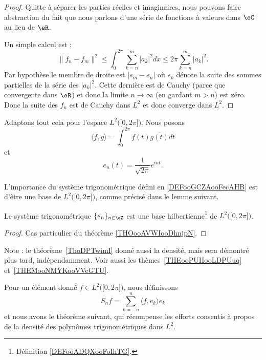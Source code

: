 \begin{proof}
    Quitte à séparer les parties réelles et imaginaires, nous pouvons faire abstraction du fait que nous parlons d'une série de fonctions à valeurs dans \( \eC\) au lieu de \( \eR\).

    Un simple calcul est :
    \begin{equation}    \label{EqHVdJxZT}
        \| f_n-f_m \|^2\leq\int_0^{2\pi}\sum_{k=n}^m| a_k |^2dx\leq 2\pi\sum_{k=n}^m| a_k |^2.
    \end{equation}
    Par hypothèse le membre de droite est \( | s_m-s_n |\) où \( s_k\) dénote la suite des sommes partielles de la série des \( | a_k |^2\). Cette dernière est de Cauchy (parce que convergente dans \( \eR\)) et donc la limite \( n\to\infty\) (en gardant \( m>n\)) est zéro. Donc la suite des \( f_n\) est de Cauchy dans \( L^2\) et donc converge dans \( L^2\).
\end{proof}

Adaptons tout cela pour l'espace \( L^2\big( \mathopen[ 0 , 2\pi \mathclose] \big)\). Nous posons
\begin{equation}        \label{EQooBFKDooMkCZOt}
    \langle f, g\rangle =\int_0^{2\pi}f(t)\overline{ g(t) }dt
\end{equation}
et
\begin{equation}        \label{EQooKMYOooLZCNap}
    e_n(t)=\frac{1}{ \sqrt{ 2\pi } } e^{int}.
\end{equation}


L'importance du système trigonométrique défini en \ref{DEFooGCZAooFecAHB} est d'être une base de \( L^2\big( \mathopen[ 0 , 2\pi \mathclose] \big)\), comme précisé dans le lemme suivant.
\begin{lemma}       \label{LEMooBJDQooLVPczR}
    Le système trigonométrique \( \{ e_n \}_{n\in \eZ}\) est une base hilbertienne\footnote{Définition \ref{DEFooADQXooFoIhTG}.} de \( L^2\big( \mathopen[ 0 , 2\pi \mathclose] \big)\).
\end{lemma}

\begin{proof}
    Cas particulier du théorème \ref{THOooAVWIooDhnjpN}.
\end{proof}

Note : le théorème~\ref{ThoDPTwimI} donné aussi la densité, mais sera démontré plus tard, indépendamment. Voir aussi les thèmes~\ref{THEooPUIIooLDPUuq} et~\ref{THEMooNMYKooVVeGTU}.

Pour un élément donné \( f\in L^2\big( \mathopen[ 0 , 2\pi \mathclose] \big)\), nous définissons
\begin{equation}
    S_nf=\sum_{k=-n}^n\langle f, e_k\rangle e_k
\end{equation}
et nous avons le théorème suivant, qui récompense les efforts consentis à propos de la densité des polynômes trigonométriques dans \( L^2\).

